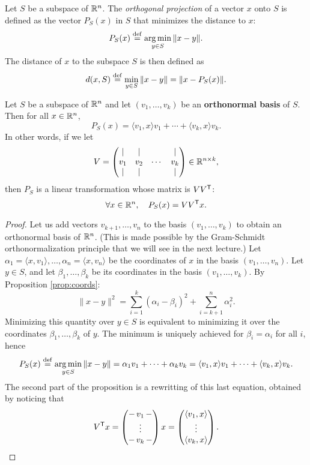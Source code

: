 \documentclass[11pt,nocut]{article}
\begin{document}
\begin{definition}
	Let $S$ be a subspace of $\mathbb{R}^n$. The \emph{orthogonal projection} of a vector $x$ onto $S$ is defined as the vector $P_S(x)$ in $S$ that minimizes the distance to $x$:
	$$
	P_S(x) \overset{\rm def}{=} \operatorname*{arg\,min}_{y \in S} \|x - y\|.
	$$
	The distance of $x$ to the subspace $S$ is then defined as
	$$
	d(x,S) \overset{\rm def}{=} \min_{y \in S} \| x - y \| = \|x - P_S(x)\|.
	$$
\end{definition}

\begin{proposition}\label{prop:ortho}
	Let $S$ be a subspace of $\mathbb{R}^n$ and let $(v_1, \dots, v_k)$ be an \textbf{orthonormal basis} of $S$. Then for all $x \in \mathbb{R}^n$,
		$$P_S(x) = \langle v_1, x \rangle v_1 + \cdots + \langle v_k, x \rangle v_k.$$
		In other words, if we let
		$$
		V = 
\begin{pmatrix}
	| & | & & | \\
	v_1 & v_2 & \cdots& v_k \\
	| & | & & |
\end{pmatrix}
\in \mathbb{R}^{n \times k},
		$$
		then $P_S$ is a linear transformation whose matrix is $VV^{{\sf T}}$:
		$$
		\forall x \in \mathbb{R}^n, \quad P_S(x) = V V^{{\sf T}} x.
		$$
\end{proposition}
\begin{proof}
	Let us add vectors $v_{k+1}, \dots, v_n$ to the basis $(v_1, \dots, v_k)$ to obtain an orthonormal basis of $\mathbb{R}^n$. (This is made possible by the Gram-Schmidt orthonormalization principle that we will see in the next lecture.)
	Let $\alpha_1 = \langle x, v_1 \rangle, \dots, \alpha_n = \langle x , v_n \rangle$ be the coordinates of $x$ in the basis $(v_1, \dots, v_n)$.
	Let $y \in S$, and let $\beta_1, \dots, \beta_k$ be its coordinates in the basis $(v_1, \dots, v_k)$. By Proposition \ref{prop:coords}:
	$$
	\|x-y\|^2 = \sum_{i=1}^k (\alpha_i - \beta_i)^2 + \sum_{i=k+1}^n \alpha_i^2.
	$$
	Minimizing this quantity over $y \in S$ is equivalent to minimizing it over the coordinates $\beta_1, \dots, \beta_k$ of $y$. The minimum is uniquely achieved for $\beta_i = \alpha_i$ for all $i$, hence
	$$
	P_S(x) \overset{\rm def}{=} \operatorname*{arg\,min}_{y \in S} \|x - y\|
	= \alpha_1 v_1 + \dots + \alpha_k v_k
	= \langle v_1, x \rangle v_1 + \dots + \langle v_k, x \rangle v_k.
	$$
	The second part of the proposition is a rewritting of this last equation, obtained by noticing that
	$$
	V^{{\sf T}} x 
	= 
\begin{pmatrix}
	- \, v_1 \, -\\
	\vdots\\
	- \, v_k \,-
\end{pmatrix}
x
=
\begin{pmatrix}
	\langle v_1, x \rangle \\
	\vdots \\
	\langle v_k, x \rangle
\end{pmatrix}.
	$$
\end{proof}
\end{document}
